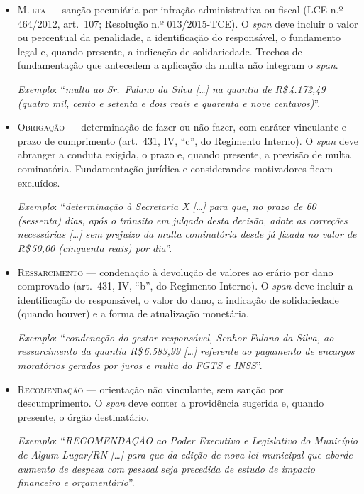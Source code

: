 \begin{itemize}
    \item \textsc{Multa} --- sanção pecuniária por infração administrativa ou fiscal (LCE n.º 464/2012, art.~107; Resolução n.º 013/2015-TCE). O \textit{span} deve incluir o valor ou percentual da penalidade, a identificação do responsável, o fundamento legal e, quando presente, a indicação de solidariedade. Trechos de fundamentação que antecedem a aplicação da multa não integram o \textit{span}.

    \textit{Exemplo}: ``\textit{multa ao Sr.\ Fulano da Silva [\ldots] na quantia de R\$\,4.172,49 (quatro mil, cento e setenta e dois reais e quarenta e nove centavos)}''.

    \item \textsc{Obrigação} --- determinação de fazer ou não fazer, com caráter vinculante e prazo de cumprimento (art.~431, IV, ``c'', do Regimento Interno). O \textit{span} deve abranger a conduta exigida, o prazo e, quando presente, a previsão de multa cominatória. Fundamentação jurídica e considerandos motivadores ficam excluídos.

    \textit{Exemplo}: ``\textit{determinação à Secretaria X [\ldots] para que, no prazo de 60 (sessenta) dias, após o trânsito em julgado desta decisão, adote as correções necessárias [\ldots] sem prejuízo da multa cominatória desde já fixada no valor de R\$\,50,00 (cinquenta reais) por dia}''.

    \item \textsc{Ressarcimento} --- condenação à devolução de valores ao erário por dano comprovado (art.~431, IV, ``b'', do Regimento Interno). O \textit{span} deve incluir a identificação do responsável, o valor do dano, a indicação de solidariedade (quando houver) e a forma de atualização monetária.

    \textit{Exemplo}: ``\textit{condenação do gestor responsável, Senhor Fulano da Silva, ao ressarcimento da quantia R\$\,6.583,99 [\ldots] referente ao pagamento de encargos moratórios gerados por juros e multa do FGTS e INSS}''.

    \item \textsc{Recomendação} --- orientação não vinculante, sem sanção por descumprimento. O \textit{span} deve conter a providência sugerida e, quando presente, o órgão destinatário.

    \textit{Exemplo}: ``\textit{RECOMENDAÇÃO ao Poder Executivo e Legislativo do Município de Algum Lugar/RN [\ldots] para que da edição de nova lei municipal que aborde aumento de despesa com pessoal seja precedida de estudo de impacto financeiro e orçamentário}''.
\end{itemize}

